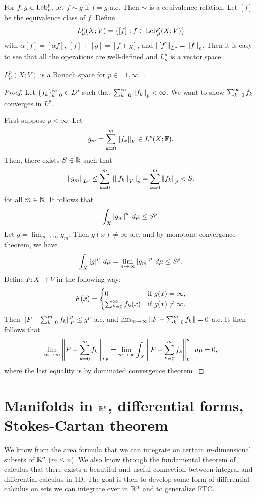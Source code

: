 \documentclass[a4paper]{article}
\begin{document}
\begin{defi}[$L^p$ spaces]
For $f, g \in \operatorname{Leb}_\mu^p$, let $f \sim g$ if
$f = g$ a.e. Then $\sim$ is a equivalence relation.
Let $[f]$ be the equivalence class of $f$. Define
\[
L^p_\mu (X; V) = \{[f] : f \in \operatorname{Leb}_\mu^p (X; V)\}
\]
with $\alpha [f] = [\alpha f]$, $[f] + [g] = [f + g]$,
and $\left\lVert [f]\right\rVert_{L^p} = \left\lVert f\right\rVert_p$. Then it is easy to see
that all the operations are well-defined and $L^p_\mu$ is
a vector space.
\end{defi}

\begin{thm}
$L^p_\mu(X; V)$ is a Banach space for $p \in [1, \infty]$.
\end{thm}

\begin{proof}
Let $\{ f_k \}_{k=0}^\infty \in L^p$ such that $\sum_{k=0}^\infty \left\lVert f_k\right\rVert_p
< \infty$. We want to show $\sum_{k=0}^\infty f_k$ converges in $L^p$.

First suppose $p < \infty$. Let
\[
g_m = \sum_{k=0}^m \left\lVert f_k\right\rVert_V \in L^p(X; \mathbb{F}).
\]
Then, there exists $S \in \mathbb{R}$ such that
\[
\left\lVert g_m\right\rVert_{L^p} \leq \sum_{k=0}^m \left\lVert \left\lVert f_k\right\rVert_V\right\rVert_p
= \sum_{k=0}^m \left\lVert f_k\right\rVert_p < S.
\]
for all $m \in \mathbb{N}$. It follows that
\[
\int_X \left\lvert g_m\right\rvert^p \; d \mu \leq S^p.
\]
Let $g = \lim_{m \to \infty} g_m$. Then
$g(x) \neq \infty$ a.e. and by monotone convergence theorem,
we have
\[
\int_X \left\lvert g\right\rvert^p \; d \mu = \lim_{n \to \infty}
\left\lvert g_m\right\rvert^p \; d \mu \leq S^p.
\]
Define $F: X \to V$ in the following way:
\[
F(x) = \begin{cases}
  0 & \text{if $g(x) = \infty$}, \\
  \sum_{k=0}^\infty f_k(x) & \text{if $g(x) \neq \infty$}.
\end{cases}
\]
Then $\left\lVert F - \sum_{k=0}^m f_k\right\rVert_V^p \leq g^p$ a.e.
and $\lim_{m \to \infty} \left\lVert F - \sum_{k=0}^m f_k\right\rVert = 0$ a.e.
It then follows that
\[
\lim_{m \to \infty} \left\lVert F - \sum_{k=0}^m f_k\right\rVert_{L^p}
= \lim_{m \to \infty} \int_X \left\lVert F - \sum_{k=0}^m f_k\right\rVert^p_V \; d \mu
= 0,
\]
where the last equality is by dominated convergence
theorem.
\end{proof}





\section{Manifolds in $\mathbb{R}^n$, differential forms,
Stokes-Cartan theorem}

We know from the area formula that we can integrate on
certain $m$-dimensional subsets of $\mathbb{R}^n$ ($m \leq n$).
We also know through the fundamental theorem of calculus that
there exists a beautiful and useful connection between
integral and differential calculus in 1D. The goal is then
to develop some form of differential calculus on sets we can
integrate over in $\mathbb{R}^n$ and to generalize FTC.
\end{document}
